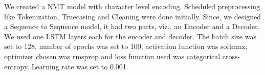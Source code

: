 We created a NMT model with character level encoding. Scheduled preprocessing like Tokenization, Truecasing and Cleaning were done initially. Since, we designed a Sequence to Sequence model, it had two parts, viz., an Encoder and a Decoder. We used one LSTM layers each for the encoder and decoder. The batch size was set to 128, number of epochs was set to 100, activation function was softmax, optimizer chosen was rmsprop and loss function used was categorical cross-entropy. Learning rate was set to 0.001.
